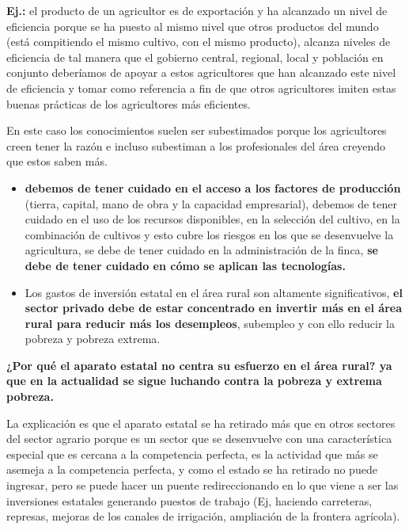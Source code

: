 \documentclass[
  letterpaper,
  DIV=11,
  numbers=noendperiod]{scrartcl}
\begin{document}
\textbf{Ej.:} el producto de un agricultor es de exportación y ha
alcanzado un nivel de eficiencia porque se ha puesto al mismo nivel que
otros productos del mundo (está compitiendo el mismo cultivo, con el
mismo producto), alcanza niveles de eficiencia de tal manera que el
gobierno central, regional, local y población en conjunto deberíamos de
apoyar a estos agricultores que han alcanzado este nivel de eficiencia y
tomar como referencia a fin de que otros agricultores imiten estas
buenas prácticas de los agricultores más eficientes.

En este caso los conocimientos suelen ser subestimados porque los
agricultores creen tener la razón e incluso subestiman a los
profesionales del área creyendo que estos saben más.

\begin{itemize}
\item
  \textbf{debemos de tener cuidado en el acceso a los factores de
  producción} (tierra, capital, mano de obra y la capacidad
  empresarial), debemos de tener cuidado en el uso de los recursos
  disponibles, en la selección del cultivo, en la combinación de
  cultivos y esto cubre los riesgos en los que se desenvuelve la
  agricultura, se debe de tener cuidado en la administración de la
  finca, \textbf{se debe de tener cuidado en cómo se aplican las
  tecnologías.}
\item
  Los gastos de inversión estatal en el área rural son altamente
  significativos, \textbf{el sector privado debe de estar concentrado en
  invertir más en el área rural para reducir más los desempleos},
  subempleo y con ello reducir la pobreza y pobreza extrema.
\end{itemize}

\textbf{¿Por qué el aparato estatal no centra su esfuerzo en el área
rural? ya que en la actualidad se sigue luchando contra la pobreza y
extrema pobreza.}

La explicación es que el aparato estatal se ha retirado más que en otros
sectores del sector agrario porque es un sector que se desenvuelve con
una característica especial que es cercana a la competencia perfecta, es
la actividad que más se asemeja a la competencia perfecta, y como el
estado se ha retirado no puede ingresar, pero se puede hacer un puente
redireccionando en lo que viene a ser las inversiones estatales
generando puestos de trabajo (Ej, haciendo carreteras, represas, mejoras
de los canales de irrigación, ampliación de la frontera agrícola).
\end{document}
